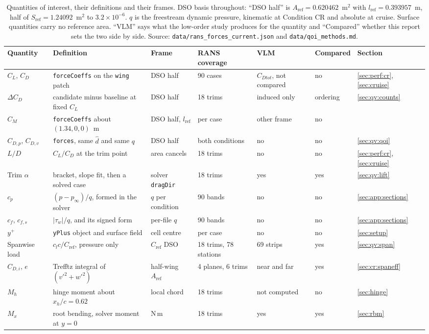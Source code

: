 \begin{table}[htbp]
  \centering
  \scriptsize
  \caption{Quantities of interest, their definitions and their frames. DSO basis throughout:
  ``DSO half'' is $A_\mathrm{ref} = 0.620462$~m$^2$ with $l_\mathrm{ref} = 0.393957$~m, half of
  $S_\mathrm{ref} = 1.24092$~m$^2$ to $3.2\times10^{-6}$. $q$ is the freestream dynamic pressure,
  kinematic at Condition CR and absolute at cruise. Surface quantities carry no reference area.
  ``VLM'' says what the low-order study produces for the quantity and ``Compared'' whether this
  report sets the two side by side. Source: \texttt{data/rans\_forces\_current.json} and \texttt{data/qoi\_methods.md}.}
  \label{tab:qv:qoi}
  \setlength{\tabcolsep}{3pt}
  \begin{tabular}{lllllll}
    \toprule
    Quantity & Definition & Frame & RANS coverage & VLM & Compared & Section \\
    \midrule
    $C_L$, $C_D$ & \texttt{forceCoeffs} on the \texttt{wing} patch & DSO half & 90 cases & $C_{Dtot}$, not compared & no & \ref{sec:perf:cr}, \ref{sec:cruise} \\
    $\Delta C_D$ & candidate minus baseline at fixed $C_L$ & DSO half & 18 trims & induced only & ordering & \ref{sec:qv:counts} \\
    $C_M$ & \texttt{forceCoeffs} about $(1.34,0,0)$~m & DSO half, $l_\mathrm{ref}$ & per case & other frame & no & \\
    $C_{D,p}$, $C_{D,v}$ & \texttt{forces}, same $\hat{d}$ and same $q$ & DSO half & both conditions & no & no & \ref{sec:qv:qoi} \\
    $L/D$ & $C_L/C_D$ at the trim point & area cancels & 18 trims & no & no & \ref{sec:perf:cr}, \ref{sec:cruise} \\
    Trim $\alpha$ & bracket, slope fit, then a solved case & solver \texttt{dragDir} & 18 trims & yes & yes & \ref{sec:qv:lift} \\
    $c_p$ & $(p - p_\infty)/q$, formed in the solver & $q$ per condition & 90 bands & no & no & \ref{sec:app:sections} \\
    $c_f$, $c_{f,s}$ & $|\tau_w|/q$, and its signed form & per-file $q$ & 90 bands & no & no & \ref{sec:app:sections} \\
    $y^+$ & \texttt{yPlus} object and surface field & cell centre & per case & no & no & \ref{sec:setup} \\
    Spanwise load & $c_l c/C_\mathrm{ref}$, pressure only & $C_\mathrm{ref}$ DSO & 18 trims, 78 stations & 69 strips & yes & \ref{sec:qv:span} \\
    $C_{D,i}$, $e$ & Trefftz integral of $(v'^2 + w'^2)$ & half-wing $A_\mathrm{ref}$ & 4 planes, 6 trims & near and far & yes & \ref{sec:cr:spaneff} \\
    $M_h$ & hinge moment about $x_h/c = 0.62$ & local chord & 18 trims & not computed & no & \ref{sec:hinge} \\
    $M_x$ & root bending, solver moment at $y = 0$ & N\,m & 18 trims & yes & yes & \ref{sec:rbm} \\
    \bottomrule
  \end{tabular}
\end{table}

